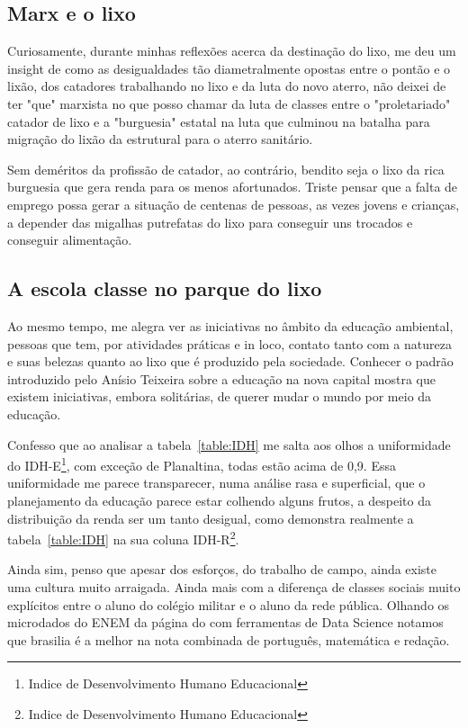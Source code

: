 \subsection{Marx e o lixo}

Curiosamente, durante minhas reflexões acerca da destinação do lixo, me deu um insight de como as desigualdades tão diametralmente opostas entre o pontão e o lixão, dos catadores trabalhando no lixo e da luta do novo aterro, não deixei de ter "que" marxista no que posso chamar da luta de classes entre o "proletariado" catador de lixo e a "burguesia" estatal na luta que culminou na batalha para migração do lixão da estrutural para o aterro sanitário.

Sem deméritos da profissão de catador, ao contrário, bendito seja o lixo da rica burguesia que gera renda para os menos afortunados. Triste pensar que a falta de emprego possa gerar a situação de centenas de pessoas, as vezes jovens e crianças, a depender das migalhas putrefatas do lixo para conseguir uns trocados e conseguir alimentação.




\subsection{A escola classe no parque do lixo}

Ao mesmo tempo, me alegra ver as iniciativas no âmbito da educação ambiental, pessoas que tem, por atividades práticas e in loco, contato tanto com a natureza e suas belezas quanto ao lixo que é produzido pela sociedade.
Conhecer o padrão introduzido pelo Anísio Teixeira sobre a educação na nova capital mostra que existem iniciativas, embora solitárias, de querer mudar o mundo por meio da educação.

Confesso que ao analisar a tabela~\ref{table:IDH} me salta aos olhos a uniformidade do IDH-E\footnote{Indice de Desenvolvimento Humano Educacional}, com exceção de Planaltina, todas estão acima de 0,9.
Essa uniformidade me parece transparecer, numa análise rasa e superficial, que o planejamento da educação parece estar colhendo alguns frutos, a despeito da distribuição da renda ser um tanto desigual, como demonstra realmente a tabela~\ref{table:IDH} na sua coluna IDH-R\footnote{Indice de Desenvolvimento Humano Educacional}.

Ainda sim, penso que apesar dos esforços, do trabalho de campo, ainda existe uma cultura muito arraigada. Ainda mais com a diferença de classes sociais muito explícitos entre o aluno do colégio militar e o aluno da rede pública. Olhando os microdados do ENEM da página do  com ferramentas de Data Science notamos que brasilia é a melhor na nota combinada de português, matemática e redação.

